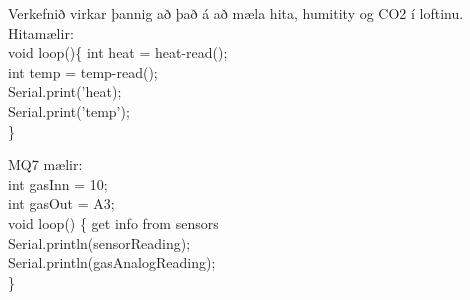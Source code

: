 Verkefnið virkar þannig að það á að mæla hita, humitity og CO2 í loftinu.\\
Hitamælir:\\
void loop()\{
	int heat = heat-read();\\
	int temp = temp-read();\\

	Serial.print('heat);\\
	Serial.print('temp');\\
\}

MQ7 mælir: \\
int gasInn = 10;\\
int gasOut = A3;\\
void loop() \{
	get info from sensors\\
	Serial.println(sensorReading);\\
	Serial.println(gasAnalogReading);\\
\}
